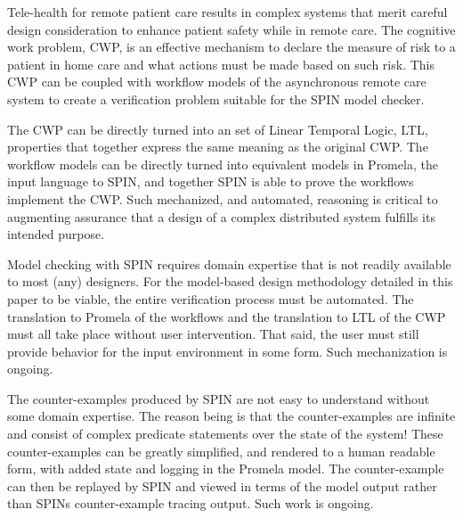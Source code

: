 Tele-health for remote patient care results in complex systems that merit careful design consideration to enhance patient safety while in remote care. The cognitive work problem, CWP, is an effective mechanism to declare the measure of risk to a patient in home care and what actions must be made based on such risk. This CWP can be coupled with workflow models of the asynchronous remote care system to create a verification problem suitable for the SPIN model checker.

The CWP can be directly turned into an set of Linear Temporal Logic, LTL, properties that together express the same meaning as the original CWP. The workflow models can be directly turned into equivalent models in Promela, the input language to SPIN, and together SPIN is able to prove the workflows implement the CWP. Such mechanized, and automated, reasoning is critical to augmenting assurance that a design of a complex distributed system fulfills its intended purpose. 

Model checking with SPIN requires domain expertise that is not readily available to most (any) designers. For the model-based design methodology detailed in this paper to be viable, the entire verification process must be automated. The translation to Promela of the workflows and the translation to LTL of the CWP must all take place without user intervention. That said, the user must still provide behavior for the input environment in some form. Such mechanization is ongoing.

The counter-examples produced by SPIN are not easy to understand without some domain expertise. The reason being is that the counter-examples are infinite and consist of complex predicate statements over the state of the system! These counter-examples can be greatly simplified, and rendered to a human readable form, with added state and logging in the Promela model. The counter-example can then be replayed by SPIN and viewed in terms of the model output rather than SPINs counter-example tracing output. Such work is ongoing.